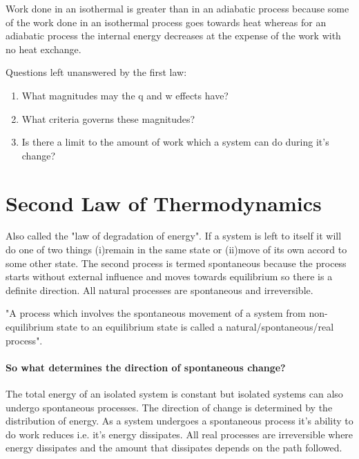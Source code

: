 \documentclass[12pt]{article}
\begin{document}
Work done in an isothermal is greater than in an adiabatic process because some of the work done in an isothermal process goes towards heat whereas for an adiabatic process the internal energy decreases at the expense of the work with no heat exchange. 

Questions left unanswered by the first law:
\begin{enumerate}
	\item What magnitudes may the q and w effects have?
	\item What criteria governs these magnitudes?
	\item Is there a limit to the amount of work which a system can do during it's change?
\end{enumerate}

\section{Second Law of Thermodynamics}
 Also called the "law of degradation of energy". If a system is left to itself it will do one of two things (i)remain in the same state or (ii)move of its own accord to some other state. The second process is termed  spontaneous because the process starts without external influence and moves towards equilibrium so there is a definite direction. All natural processes are spontaneous and irreversible.\\

\begin{center}
	{\color{red}"A process which involves the spontaneous movement of a system from non-equilibrium state to an equilibrium state is called a natural/spontaneous/real process".}
\end{center}
 
 \paragraph{So what determines the direction of spontaneous change?}
 The total energy of an isolated system is constant but isolated systems can also undergo spontaneous processes. The direction of change is determined by the distribution of energy. As a system undergoes a spontaneous process it's ability to do work reduces i.e. it's energy dissipates. All real processes are irreversible where energy dissipates and the amount that dissipates depends on the path followed. 
\end{document}
